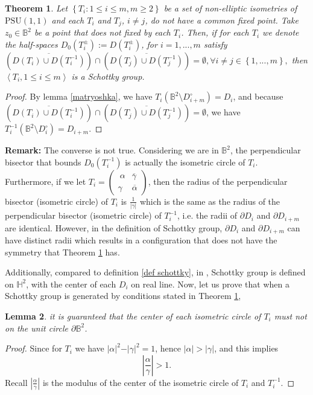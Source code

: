 \documentclass[12pt,oneside]{sfsuthesis}
\theoremstyle{plain} %
\newtheorem{theorem}{Theorem}[chapter]
\newtheorem{lemma}[theorem]{Lemma}
\theoremstyle{definition}  %
\theoremstyle{remark}  %
\theoremstyle{plain}
\begin{document}
{\begin{theorem}\label{thm schottky}
Let $\left\lbrace T_i: 1\leq i \leq m, m\geq 2\right\rbrace$ be a set of non-elliptic isometries of $\text{PSU}(1,1)$ and each $T_i$ and $T_j$, $i\neq j$, do not have a common fixed point. Take $z_0\in \mathbb{B}^2$ be a point that does not fixed by each $T_i$. Then, if for each $T_i$ we denote the half-spaces $D_0(T_i^{\pm}):=D(T_i^{\pm})$, for $i=1,...,m$ satisfy $
\left( \overline{D(T_i)\cup D(T_i^{-1}) }\right)\cap \left( \overline{D(T_j)\cup D(T_j^{-1})}\right)=\emptyset, 
\forall i\neq j\in\left\lbrace 1,...,m\right\rbrace,$ then $\left\langle T_i, 1\leq i \leq m\right\rangle$ is a Schottky group.
\end{theorem}
\begin{proof}
By lemma \ref{matryoshka}, we have $T_i ({\mathbb  B}^2\setminus D^{\circ}_{i+m}) = D_{i}$, and because $\left( \overline{D(T_i)\cup D(T_i^{-1}) }\right)\cap \left( \overline{D(T_j)\cup D(T_j^{-1})}\right)=\emptyset$, we have $T_i^{-1}\left( \mathbb{B}^2\setminus D^{\circ}_{i}\right)=D_{i+m}$.
\end{proof}
\textbf{Remark:} The converse is not true. Considering we are in $\mathbb{B}^2$, the perpendicular bisector that bounds $D_0(T_i^{-1})$ is actually the isometric circle of $T_i$\cite[section 7.22]{beardon2012geometry}. Furthermore, if we let $T_i=\begin{pmatrix}\
\alpha &  \overline{\gamma}\\
\gamma &  \overline{\alpha}
\end{pmatrix}$, then the radius of the perpendicular bisector (isometric circle) of $T_i$ is $\frac{1}{\vert \gamma \vert}$ which is the same as the radius of the perpendicular bisector (isometric circle) of $T_i^{-1}$, i.e. the radii of $\partial D_i$ and $\partial D_{i+m}$ are identical. However, in the definition of Schottky group, $\partial D_i$ and $\partial D_{i+m}$ can have distinct radii which results in a configuration that does not have the symmetry that Theorem \ref{thm schottky} has.

Additionally, compared to definition \ref{def schottky}, in \cite{borthwick2007spectral}, Schottky group is defined on $\mathbb{H}^2$, with the center of each $D_{i}$ on real line. Now, let us prove that when a Schottky group is generated by conditions stated in Theorem \ref{thm schottky}, 
\begin{lemma}\label{the center of each isometric circle}
it is guaranteed that the center of each isometric circle of $T_i$ must not on the unit circle $\partial \mathbb{B}^2$. 
\end{lemma}
\begin{proof}
Since for $T_i$ we have $\vert \alpha\vert^2-\vert \gamma\vert^2=1$, hence $\vert \alpha\vert>\vert \gamma \vert$, and this implies 
$$
\left \vert \frac{\alpha}{\gamma}\right\vert>1.
$$
Recall $\left \vert \frac{\alpha}{\gamma}\right\vert$ is the modulus of the center of the isometric circle of $T_i$ and $T_i^{-1}$.
\end{proof}

}
\end{document}
